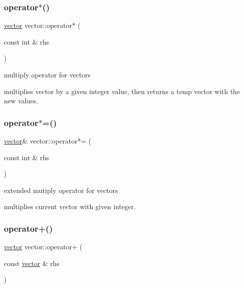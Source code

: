 \subsubsection{\texorpdfstring{operator$\ast$()}{operator*()}}
{\footnotesize\ttfamily \hyperlink{classvector}{vector} vector\+::operator$\ast$ (\begin{DoxyParamCaption}\item[{const int \&}]{rhs }\end{DoxyParamCaption})\hspace{0.3cm}{\ttfamily [inline]}}



multiply operator for vectors 

multiplies vector by a given integer value, then returns a temp vector with the new values. \mbox{\label{classvector_af770ce4b87b6b76ae1bbc2393013f3d5}} 
\subsubsection{\texorpdfstring{operator$\ast$=()}{operator*=()}}
{\footnotesize\ttfamily \hyperlink{classvector}{vector}\& vector\+::operator$\ast$= (\begin{DoxyParamCaption}\item[{const int \&}]{rhs }\end{DoxyParamCaption})\hspace{0.3cm}{\ttfamily [inline]}}



extended mutiply operator for vectors 

multiplies current vector with given integer. \mbox{\label{classvector_a215519ce92bacbbefd0e6cc1e985ace7}} 
\subsubsection{\texorpdfstring{operator+()}{operator+()}}
{\footnotesize\ttfamily \hyperlink{classvector}{vector} vector\+::operator+ (\begin{DoxyParamCaption}\item[{const \hyperlink{classvector}{vector} \&}]{rhs }\end{DoxyParamCaption})\hspace{0.3cm}{\ttfamily [inline]}}



